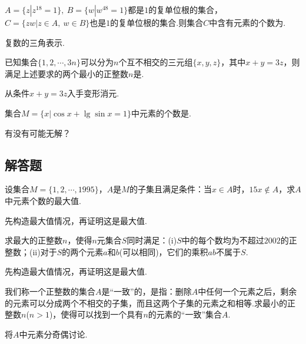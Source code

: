 \documentclass[lang=cn, zihao=4.5]{elegantbook}
\newcommand{\tk}{\uline{\hspace{4em}}}
\begin{document}
\begin{example} %
	$A=\{ z|z^{18}=1 \},~ B=\{ w|w^{48}=1 \}$都是$1$的复单位根的集合，$C=\{ zw|z \in A,~ w \in B \}$也是$1$的复单位根的集合.则集合$C$中含有元素的个数为\tk .
\end{example}
\begin{hint}
	复数的三角表示.
\end{hint}

\begin{example} %
	已知集合$\{ 1,2, \cdots ,3n \}$可以分为$n$个互不相交的三元组$\{ x,y,z \}$，其中$x+y=3z$，则满足上述要求的两个最小的正整数$n$是\tk .
\end{example}
\begin{hint}
	从条件$x+y=3z$入手变形消元.
\end{hint}

\begin{example} %
	集合$M= \{ x|\cos{x} + \lg \sin{x} = 1 \}$中元素的个数是\tk .
\end{example}
\begin{hint}
	有没有可能无解？
\end{hint}

\subsection*{解答题}

\begin{example} %
	设集合$M = \{ 1,2, \cdots ,1995 \}$，$A$是$M$的子集且满足条件：当$x \in A$时，$15x \notin A$，求$A$中元素个数的最大值.
\end{example}
\begin{hint}
	先构造最大值情况，再证明这是最大值.
\end{hint}

\begin{example} %
	求最大的正整数$n$，使得$n$元集合$S$同时满足：(i)$S$中的每个数均为不超过$2002$的正整数；(ii)对于$S$的两个元素$a$和$b$(可以相同)，它们的乘积$ab$不属于$S$.
\end{example}
\begin{hint}
	先构造最大值情况，再证明这是最大值.
\end{hint}

\begin{example} %
	我们称一个正整数的集合$A$是“一致”的，是指：删除$A$中任何一个元素之后，剩余的元素可以分成两个不相交的子集，而且这两个子集的元素之和相等.求最小的正整数$n$($n>1$)，使得可以找到一个具有$n$的元素的“一致”集合$A$.
\end{example}
\begin{hint}
	将$A$中元素分奇偶讨论.
\end{hint}
\end{document}
